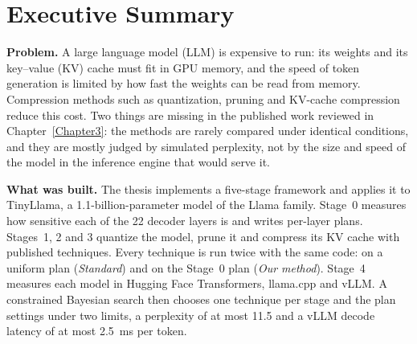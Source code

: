 \chapter*{Executive Summary}

\noindent\textbf{Problem.} A large language model (LLM) is expensive to run: its weights and its key--value (KV) cache must fit in GPU memory, and the speed of token generation is limited by how fast the weights can be read from memory. Compression methods such as quantization, pruning and KV-cache compression reduce this cost. Two things are missing in the published work reviewed in Chapter~\ref{Chapter3}: the methods are rarely compared under identical conditions, and they are mostly judged by simulated perplexity, not by the size and speed of the model in the inference engine that would serve it.

\medskip\noindent\textbf{What was built.} The thesis implements a five-stage framework and applies it to TinyLlama, a 1.1-billion-parameter model of the Llama family. Stage~0 measures how sensitive each of the 22 decoder layers is and writes per-layer plans. Stages~1, 2 and 3 quantize the model, prune it and compress its KV cache with published techniques. Every technique is run twice with the same code: on a uniform plan (\emph{Standard}) and on the Stage~0 plan (\emph{Our method}). Stage~4 measures each model in Hugging Face Transformers, llama.cpp and vLLM. A constrained Bayesian search then chooses one technique per stage and the plan settings under two limits, a perplexity of at most 11.5 and a vLLM decode latency of at most 2.5~ms per token.

